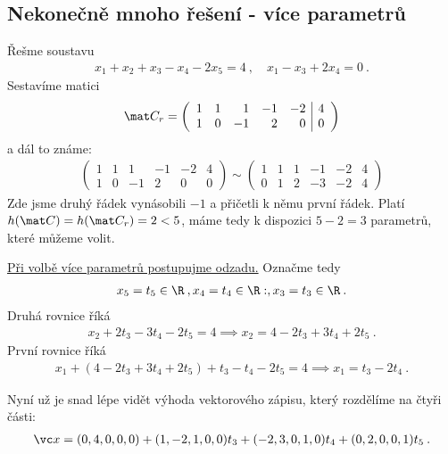 \subsection*{Nekonečně mnoho řešení - více parametrů}

\begin{example}
    Řešme soustavu
    \begin{align}
        x_1 + x_2 + x_3 - x_4 - 2x_5 = 4 \:, \quad x_1 - x_3 + 2 x_4 = 0 \:.
    \end{align}
    Sestavíme matici
    \begin{align}
        \mat C_r = \left(\begin{array}{rrrrr|r}
            1 & 1 & 1 & -1 &-2 &4 \\ 1 &0 &-1 &2 &0 &0 
        \end{array}\right)
    \end{align}
    a dál to známe:
    \begin{align}
        \left(\begin{array}{rrrrr|r}
            1 & 1 & 1 & -1 &-2 &4 \\ 1 &0 &-1 &2 &0 &0 
        \end{array}\right)
        \sim
        \left(\begin{array}{rrrrr|r}
            1 & 1 & 1 & -1 &-2 &4 \\ 0 &1 &2 &-3 &-2 & 4 
        \end{array}\right)
    \end{align}
    Zde jsme druhý řádek vynásobili $-1$ a přičetli k němu první řádek. Platí $h(\mat C) = h(\mat C_r) = 2 < 5$, máme tedy k dispozici $5-2=3$ parametrů, které můžeme volit.
    
    \underline{Při volbě více parametrů postupujme odzadu.} Označme tedy
    \begin{align}
        x_5 = t_5 \in \R \:, x_4 = t_4 \in \R :, x_3 = t_3 \in \R \:.
    \end{align}
    Druhá rovnice říká \begin{align}
        x_2 + 2 t_3 - 3 t_4 - 2 t_5 = 4 \implies x_2 = 4 - 2 t_3 + 3 t_4 + 2 t_5 \:.
    \end{align}
    První rovnice říká \begin{align}
        x_1 + (4 - 2 t_3 + 3 t_4 + 2 t_5) + t_3 - t_4 - 2 t_5 = 4 \implies x_1 = t_3 - 2t_4 \:.
    \end{align}

    Nyní už je snad lépe vidět výhoda vektorového zápisu, který rozdělíme na čtyři části:
    \begin{align}
        \vc x = (0,4,0,0,0) + (1,-2,1,0,0) t_3 + (-2,3,0,1,0) t_4 + (0,2,0,0,1) t_5 \:.
    \end{align}
\end{example}

